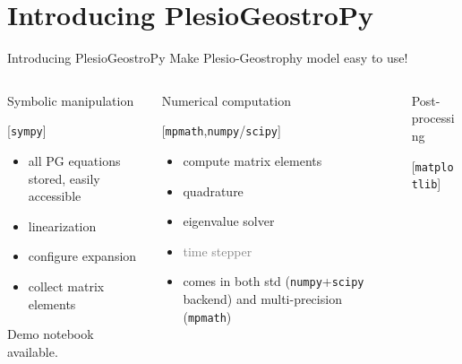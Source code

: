 \documentclass[11pt,aspectratio=169]{beamer}
\begin{document}
\section{Introducing PlesioGeostroPy}
\begin{frame}{Introducing PlesioGeostroPy}
    Make Plesio-Geostrophy model easy to use!
	\vspace{2em}

	\begin{columns}[t]
	\begin{column}{.32\linewidth}
		Symbolic manipulation

		[\texttt{sympy}]
		\begin{itemize}
			\item all PG equations stored, easily accessible
			\item linearization
			\item configure expansion
			\item collect matrix elements
		\end{itemize}
		\vspace{1em}

		Demo notebook available.
	\end{column}
	\begin{column}{.32\linewidth}
		Numerical computation

		[\texttt{mpmath},\texttt{numpy}/\texttt{scipy}]
		\begin{itemize}
			\item compute matrix elements
			\item quadrature
			\item eigenvalue solver
			\item \textcolor{gray}{time stepper}
			\item comes in both std (\texttt{numpy}+\texttt{scipy} backend) and multi-precision (\texttt{mpmath})
		\end{itemize}
	\end{column}
	\begin{column}{.25\linewidth}
		Post-processing

		[\texttt{matplotlib}]
	\end{column}
	\end{columns}
\end{frame}
\end{document}
